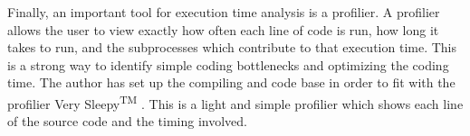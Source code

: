 \indent Finally, an important tool for execution time analysis is a profilier. A profilier allows the user to view exactly how often each line of code is run, how long it takes to run, and the subprocesses which contribute to that execution time. This is a strong way to identify simple coding bottlenecks and optimizing the coding time. The author has set up the compiling and code base in order to fit with the profilier Very Sleepy\textsuperscript{TM} \cite{Sleepy}. This is a light and simple profilier which shows each line of the source code and the timing involved. \par



